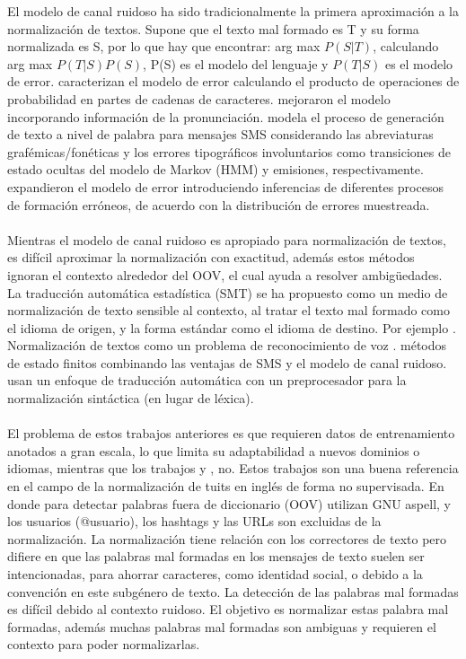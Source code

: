 \documentclass[spanish,12pt, a4paper,twoside]{paper}
\begin{document}
El modelo de canal ruidoso \cite{shannon:1948} ha sido tradicionalmente la primera aproximación a la normalización de textos. Supone que el texto mal formado es T y su forma normalizada es S, por lo que hay que encontrar: arg max $P(S|T)$, calculando arg max $P(T|S) P(S)$, P(S) es el modelo del lenguaje y $P(T|S)$ es el modelo de error. \cite{brillmoore:2000} caracterizan el modelo de error calculando el producto de operaciones de probabilidad en partes de cadenas de caracteres. \cite{toutanovamoore:2002} mejoraron el modelo incorporando información de la pronunciación. \cite{choudhury:2007} modela el proceso de generación de texto a nivel de palabra para mensajes SMS considerando las abreviaturas grafémicas/fonéticas y los errores tipográficos involuntarios como transiciones de estado ocultas del modelo de Markov (HMM) y emisiones, respectivamente. \cite{cookstevenson:2009} expandieron el modelo de error introduciendo inferencias de diferentes procesos de formación erróneos, de acuerdo con la distribución de errores muestreada.\\\\Mientras el modelo de canal ruidoso es apropiado para normalización de textos, es difícil aproximar la normalización con exactitud, además estos métodos ignoran el contexto alrededor del OOV, el cual ayuda a resolver ambigüedades. La traducción automática estadística (SMT) se ha propuesto como un medio de normalización de texto sensible al contexto, al tratar el texto mal formado como el idioma de origen, y la forma estándar como el idioma de destino. Por ejemplo \cite{aw:2006}. Normalización de textos como un problema de reconocimiento de voz \cite{kobus:2008}. \cite{beaufort:2002} métodos de estado finitos combinando las ventajas de SMS y el modelo de canal ruidoso. \cite{kaufmannkalita:2010} usan un enfoque de traducción automática con un preprocesador para la normalización sintáctica (en lugar de léxica).\\\\El problema de estos trabajos anteriores es que requieren datos de entrenamiento anotados a gran escala, lo que limita su adaptabilidad a nuevos dominios o idiomas, mientras que los trabajos \cite{whitelaw:2009} y \cite{baldwin:2011}, no. Estos trabajos son una buena referencia en el campo de la normalización de tuits en inglés de forma no supervisada. En donde para detectar palabras fuera de diccionario (OOV) utilizan GNU aspell, y los usuarios (@usuario), los hashtags y las URLs son excluidas de la normalización. La normalización tiene relación con los correctores de texto \cite{peterson:1980} pero difiere en que las palabras mal formadas en los mensajes de texto suelen ser intencionadas, para ahorrar caracteres, como identidad social, o debido a la convención en este subgénero de texto. La detección de las palabras mal formadas es difícil debido al contexto ruidoso. El objetivo es normalizar estas palabra mal formadas, además muchas palabras mal formadas son ambiguas y requieren el contexto para poder normalizarlas.
\end{document}

